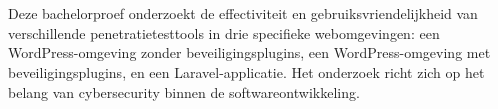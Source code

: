 
%
%
%
%
%

%



\chapter*{}

Deze bachelorproef onderzoekt de effectiviteit en gebruiksvriendelijkheid van verschillende penetratietesttools in drie specifieke webomgevingen: 
een WordPress-omgeving zonder beveiligingsplugins, een WordPress-omgeving met beveiligingsplugins, en een Laravel-applicatie. Het onderzoek richt 
zich op het belang van cybersecurity binnen de softwareontwikkeling.

